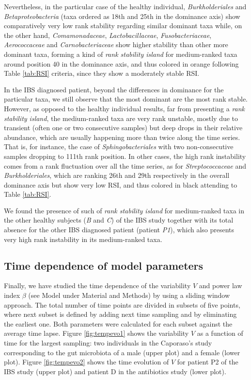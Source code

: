 Nevertheless, in the particular case of the healthy individual, \emph{Burkholderiales} and \emph{Betaproteobacteria} (taxa ordered as 18th and 25th in the dominance axis) show comparatively very low rank stability regarding similar dominant taxa while, on the other hand, \emph{Comamonadaceae}, \emph{Lactobacillaceae}, \emph{Fusobacteriaceae}, \emph{Aerococcaceae} and \emph{Carnobacteriaceae} show higher stability than other more dominant taxa, forming a kind of \emph{rank stability island} for medium-ranked taxa around position 40 in the dominance axis, and thus colored in orange following Table \ref{tab:RSI} criteria, since they show a moderately stable RSI.

In the IBS diagnosed patient, beyond the differences in dominance for the particular taxa, we still observe that the most dominant are the most rank stable. However, as opposed to the healthy individual results, far from presenting a \emph{rank stability island}, the medium-ranked taxa are very rank unstable, mostly due to transient (often one or two consecutive samples) but deep drops in their relative abundance, which are usually happening more than twice along the time series. That is, for instance, the case of \emph{Sphingobacteriales} with two non-consecutive samples dropping to 111th rank position. In other cases, the high rank instability comes from a rank fluctuation over all the time series, as for \emph{Streptococcaceae} and \emph{Burkholderiales}, which are ranking 26th and 29th respectively in the overall dominance axis but show very low RSI, and thus colored in black attending to Table \ref{tab:RSI}.

We found the presence of such of \emph{rank stability island} for medium-ranked taxa in the other healthy subjects (\emph{B} and \emph{C}) of the IBS study\cite{IBS} together with its total absence for the other IBS diagnosed patient (patient \emph{P1}), which also presents very high rank instability in its medium-ranked taxa.

\subsection*{Time dependence of model parameters}

Finally, we have studied the time dependence of the variability $V$ and power law index $\beta$ (see Model under Material and Methods) by using a sliding window approach. The total number of time points are divided in subsets of five points, where next subset is defined by adding next time sampling and by eliminating the earliest one. Both parameters were calculated for each subset against the average time lapse. Figure \ref{fig:tempevo1} shows the variability  $V$ as a function of time for the largest sampling: two individuals in the Caporaso's study\cite{moving} corresponding to the gut microbiota of a male (upper plot) and a female (lower plot). Figure \ref{fig:tempevo2} shows the time evolution of $V$ for patient P2 of the IBS study\cite{IBS} (upper plot) and patient D in the antibiotics study\cite{antibiotic} (lower plot). 

